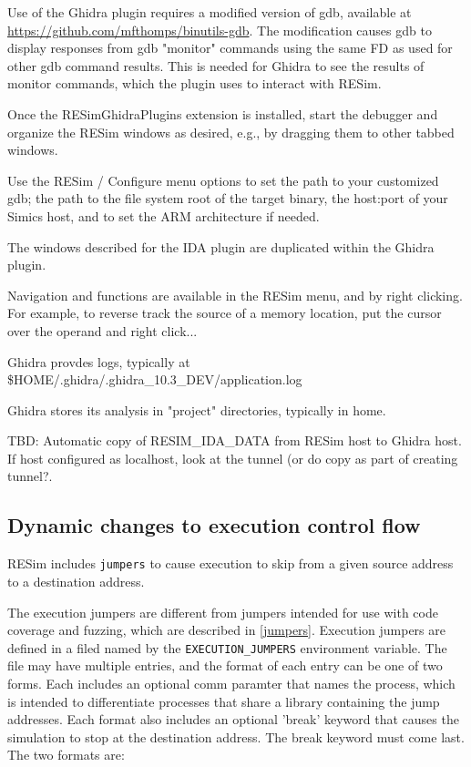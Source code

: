 \documentclass[titlepage]{article}
\begin{document}
Use of the Ghidra plugin requires a modified version of gdb, available at
\url{https://github.com/mfthomps/binutils-gdb}.  The modification causes
gdb to display responses from gdb "monitor" commands using the same FD as used
for other gdb command results.  This is needed for Ghidra to see the results of monitor commands, which the plugin
uses to interact with RESim.

Once the RESimGhidraPlugins extension is installed, start the debugger and organize the RESim windows
as desired, e.g., by dragging them to other tabbed windows.

Use the RESim / Configure menu options to set the path to your customized gdb; the path to
the file system root of the target binary, the host:port of your Simics host, and to set the ARM architecture if needed.

The windows described for the IDA plugin are duplicated within the Ghidra plugin.

Navigation and functions are available in the RESim menu, and by right clicking.  For example, to reverse track
the source of a memory location, put the cursor over the operand and right click...

Ghidra provdes logs, typically at \$HOME/.ghidra/.ghidra\_10.3\_DEV/application.log

Ghidra stores its analysis in "project" directories, typically in home.

TBD: Automatic copy of RESIM\_IDA\_DATA from RESim host to Ghidra host.  If host configured as localhost, look
at the tunnel (or do copy as part of creating tunnel?.  


\subsection{Dynamic changes to execution control flow}
\label{dynamic_control_flow}
RESim includes {\tt jumpers} to cause execution to skip from a given source address to a destination address.

The execution jumpers are different from jumpers intended for use with code coverage and fuzzing,
which are described in \ref{jumpers}.
Execution jumpers are defined in a filed named by the {\tt EXECUTION\_JUMPERS} environment variable.
The file may have multiple entries, and the format of each entry can be one of two forms.  
Each includes an optional comm paramter that names the process,
which is intended to differentiate processes that share a library containing the jump 
addresses. Each format also includes an optional 'break' keyword that causes the
simulation to stop at the destination address. The break keyword must come last.
The two formats are:
\end{document}
